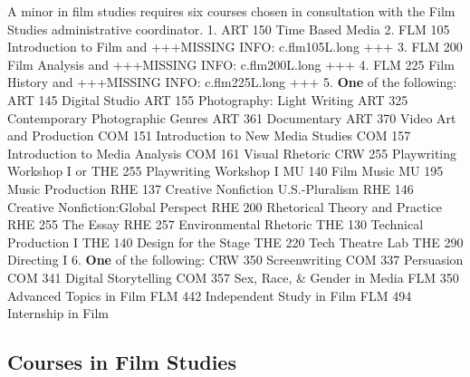 \documentclass[
  letterpaper,
]{scrbook}
\begin{document}
A minor in film studies requires six courses chosen in consultation with
the Film Studies administrative coordinator. 1. ART 150 Time Based Media
2. FLM 105 Introduction to Film and +++MISSING INFO: c.flm105L.long +++
3. FLM 200 Film Analysis and +++MISSING INFO: c.flm200L.long +++ 4. FLM
225 Film History and +++MISSING INFO: c.flm225L.long +++ 5. \textbf{One}
of the following: ART 145 Digital Studio ART 155 Photography: Light
Writing ART 325 Contemporary Photographic Genres ART 361 Documentary ART
370 Video Art and Production COM 151 Introduction to New Media Studies
COM 157 Introduction to Media Analysis COM 161 Visual Rhetoric CRW 255
Playwriting Workshop I or THE 255 Playwriting Workshop I MU 140 Film
Music MU 195 Music Production RHE 137 Creative Nonfiction U.S.-Pluralism
RHE 146 Creative Nonfiction:Global Perspect RHE 200 Rhetorical Theory
and Practice RHE 255 The Essay RHE 257 Environmental Rhetoric THE 130
Technical Production I THE 140 Design for the Stage THE 220 Tech Theatre
Lab THE 290 Directing I 6. \textbf{One} of the following: CRW 350
Screenwriting COM 337 Persuasion COM 341 Digital Storytelling COM 357
Sex, Race, \& Gender in Media FLM 350 Advanced Topics in Film FLM 442
Independent Study in Film FLM 494 Internship in Film

\subsection{Courses in Film Studies}\label{courses-in-film-studies}
\end{document}
